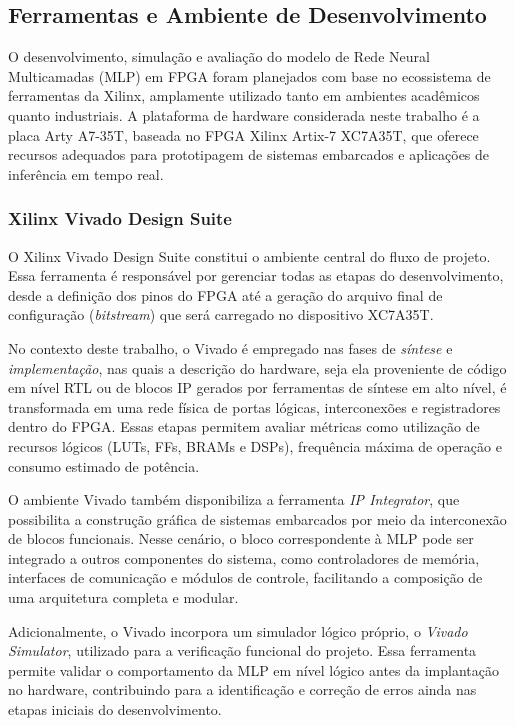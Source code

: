 \subsection{Ferramentas e Ambiente de Desenvolvimento}

O desenvolvimento, simulação e avaliação do modelo de Rede Neural Multicamadas
(MLP) em FPGA foram planejados com base no ecossistema de ferramentas da Xilinx,
amplamente utilizado tanto em ambientes acadêmicos quanto industriais. A
plataforma de hardware considerada neste trabalho é a placa Arty A7-35T,
baseada no FPGA Xilinx Artix-7 XC7A35T, que oferece recursos adequados para
prototipagem de sistemas embarcados e aplicações de inferência em tempo real.

\subsubsection*{Xilinx Vivado Design Suite}

O Xilinx Vivado Design Suite constitui o ambiente central do fluxo de projeto.
Essa ferramenta é responsável por gerenciar todas as etapas do desenvolvimento,
desde a definição dos pinos do FPGA até a geração do arquivo final de configuração
(\textit{bitstream}) que será carregado no dispositivo XC7A35T.

No contexto deste trabalho, o Vivado é empregado nas fases de \textit{síntese} e
\textit{implementação}, nas quais a descrição do hardware, seja ela proveniente
de código em nível RTL ou de blocos IP gerados por ferramentas de síntese em alto
nível, é transformada em uma rede física de portas lógicas, interconexões e
registradores dentro do FPGA. Essas etapas permitem avaliar métricas como
utilização de recursos lógicos (LUTs, FFs, BRAMs e DSPs), frequência máxima de
operação e consumo estimado de potência.

O ambiente Vivado também disponibiliza a ferramenta \textit{IP Integrator}, que
possibilita a construção gráfica de sistemas embarcados por meio da interconexão
de blocos funcionais. Nesse cenário, o bloco correspondente à MLP pode ser
integrado a outros componentes do sistema, como controladores de memória,
interfaces de comunicação e módulos de controle, facilitando a composição de uma
arquitetura completa e modular.

Adicionalmente, o Vivado incorpora um simulador lógico próprio, o
\textit{Vivado Simulator}, utilizado para a verificação funcional do projeto.
Essa ferramenta permite validar o comportamento da MLP em nível lógico antes da
implantação no hardware, contribuindo para a identificação e correção de erros
ainda nas etapas iniciais do desenvolvimento.


